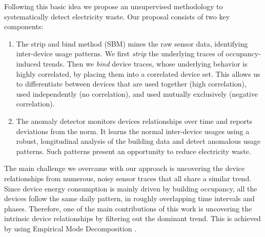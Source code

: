Following this basic idea we propose an unsupervised methodology to systematically detect electricity waste.
Our proposal consists of two key components:

\begin{enumerate}
 \item The strip and bind method (SBM) mines the raw sensor data, identifying inter-device usage patterns.%
We first \emph{strip} the underlying traces of occupancy-induced trends.  Then we \emph{bind} device traces, whose underlying behavior
is highly correlated, by placing them into a correlated device set.
 This allows us to differentiate between devices that are used together (high correlation), used independently (no correlation), and used mutually exclusively (negative correlation).
 \item The anomaly detector monitors devices relationships over time and reports deviations from the norm.  %
 It learns the normal inter-device usages using a robust, longitudinal analysis of the building data and detect anomalous usage patterns.  Such
 patterns present an opportunity to reduce electricity waste.
\end{enumerate}

The main challenge we overcame with our approach is uncovering the device relationships from numerous, noisy sensor traces
that all share a similar trend.
Since device energy consumption is mainly driven by building occupancy, all the devices follow the same daily pattern, 
in roughly overlapping time intervals and phases.
Therefore, one of the main contributions of this work is uncovering the intrinsic device relationships by filtering out the dominant
trend.  This is achieved by using Empirical Mode Decomposition \cite{huang:emd1998}.

